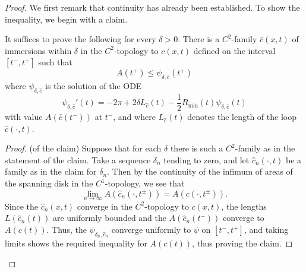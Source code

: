 \begin{proof}
 We first remark that continuity has already been established.
To show the inequality, we begin  with a claim.

\begin{claim}
\label{claim:curve-shrinking-approximation-suffices}
It suffices to prove the following for every $\delta>0$. There is a
$C^2$-family $\hat c(x,t)$ of immersions within $\delta$ in the
$C^2$-topology to $c(x,t)$ defined on the interval $[t^-,t^+]$ such
that
$$A(t^+)\le \psi_{\delta,\hat c}(t^+)$$
where $\psi_{\delta,\hat c}$ is the solution of the ODE
$$\psi_{\delta,\hat c}'(t)=-2\pi+2\delta L_{\hat c}(t)-\frac{1}{2}R_\mathrm{min}(t)\psi_{\delta,\hat c}(t)$$ with value $A(\hat c(t^-))$ at
$t^-$, and where $L_{\hat c}(t)$ denotes the length of the loop
$\hat c(\cdot,t)$.
\end{claim}

\begin{proof} (of the claim) Suppose that for each $\delta$ there is such
a $C^2$-family as in the statement of the claim. Take a sequence
$\delta_n$ tending to zero, and let $\hat c_n(\cdot,t)$ be a family
as in the claim for $\delta_n$. Then by the continuity of the
infimum of areas of the spanning disk in the $C^1$-topology, we see
that
$$\lim_{n\rightarrow \infty}A(\hat c_n(\cdot, t^\pm))=A(c(\cdot,t^\pm)).$$
Since the $\hat c_n(x,t)$ converge in the $C^2$-topology to
$c(x,t)$, the lengths $L(\hat c_n(t))$ are uniformly bounded and the
$A(\hat c_n(t^-))$ converge to $A(c(t))$. Thus, the
$\psi_{\delta_n,\hat c_n}$ converge uniformly to $\psi$ on
$[t^-,t^+]$, and taking limits shows the required inequality for
$A(c(t))$, thus proving the claim.
\end{proof}


\end{proof}
